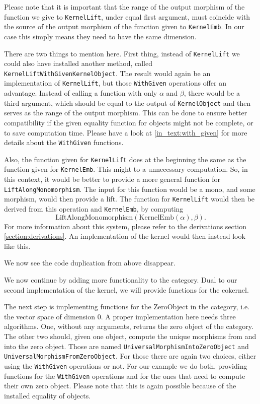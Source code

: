 Please note that it is important that the range of the output morphism of the function we give to \texttt{KernelLift},
under equal first argument, must coincide with the source of the output morphism of the function given to \texttt{KernelEmb}.
In our case this simply means they need to have the same dimension.



There are two things to mention here.
First thing, instead of \texttt{KernelLift} we could also have installed another method,
called \texttt{KernelLiftWithGivenKernelObject}. The result would again be an implementation of \texttt{KernelLift}, but those
\texttt{WithGiven} operations offer an advantage. Instead of calling a function with only $\alpha$ and $\beta$, there
would be a third argument, which should be equal to the output of \texttt{KernelObject} and then serves as the range of the output morphism.
This can be done to ensure better compatibility if the given equality function for objects might not be complete, or to save computation time.
Please have a look at \ref{in_text:with_given} for more details about the \texttt{WithGiven} functions.

Also, the function given for \texttt{KernelLift} does at the beginning the same as the function given for \texttt{KernelEmb}. This might to
a unnecessary computation. So, in this context, it would be better to provide a more general function for \texttt{LiftAlongMonomorphism}.
The input for this function would be a mono, and some morphism, would then provide a lift. The function for \texttt{KernelLift} would then be derived
from this operation and \texttt{KernelEmb}, by computing
\[
 \mathrm{LiftAlongMonomorphism} \left( \mathrm{KernelEmb} \left( \alpha \right), \beta \right).
\]
For more information about this system, please refer to the derivations section \ref{section:derivations}.
An implementation of the kernel would then instead look like this.



We now see the code duplication from above disappear.

We now continue by adding more functionality to the category. Dual to our second implementation of the kernel,
we will provide functions for the cokernel.



The next step is implementing functions for the \textrm{ZeroObject} in the category, i.e. the vector space
of dimension 0. A proper implementation here needs three algorithms. One, without any arguments, returns the
zero object of the category. The other two should, given one object, compute the unique morphisms from and into
the zero object. Those are named \texttt{UniversalMorphismIntoZeroObject} and \texttt{UniversalMorphismFromZeroObject}.
For those there are again two choices, either using the \texttt{WithGiven} operations or not.
For our example we do both, providing functions for the \texttt{WithGiven} operations and for the ones that
need to compute their own zero object. Please note that this is again possible because of the installed equality of objects.

